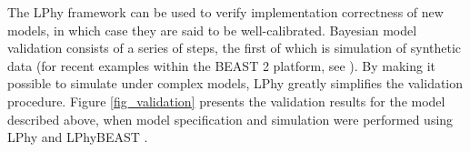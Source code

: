 \documentclass[10pt,letterpaper,table]{article}
\begin{document}
\noindent The LPhy framework can be used to verify implementation correctness of new models, in which case they are said to be well-calibrated.
Bayesian model validation consists of a series of steps, the first of which is simulation of synthetic data (for recent examples within the BEAST 2 platform, see \cite{gaboriau20,chen2022accounting}). 
By making it possible to simulate under complex models, LPhy greatly simplifies the validation procedure.
Figure \ref{fig_validation} presents the validation results for the model described above, when model specification and simulation were performed using LPhy and LPhyBEAST \cite{chen2022accounting}.



\end{document}
